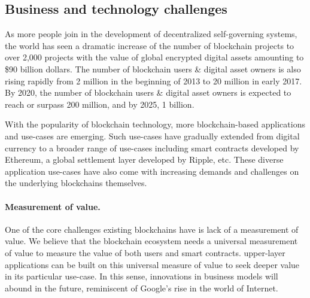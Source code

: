 \subsection{Business and technology challenges}
As more people join in the development of decentralized self-governing systems, the world has seen a dramatic increase of the number of blockchain projects to over 2,000 projects with the value of global encrypted digital assets amounting to \$90 billion dollars. The number of blockchain users \& digital asset owners is also rising rapidly from 2 million in the beginning of 2013 to 20 million in early 2017. By 2020, the number of blockchain users \& digital asset owners is expected to reach or surpass 200 million, and by 2025, 1 billion.

With the popularity of blockchain technology, more blockchain-based applications and use-cases are emerging.  Such use-cases have gradually extended from digital currency to a broader range of use-cases including smart contracts developed by Ethereum, a global settlement layer developed by Ripple, etc. These diverse application use-cases have also come with increasing demands and challenges on the underlying blockchains themselves.

\paragraph{Measurement of value.} One of the core challenges existing blockchains have is lack of a measurement of value. We believe that the blockchain ecosystem needs a universal measurement of value to measure the value of both users and smart contracts. upper-layer applications can be built on this universal measure of value to seek deeper value in its particular use-case. In this sense, innovations in business models will abound in the future, reminiscent of Google's rise in the world of Internet.

